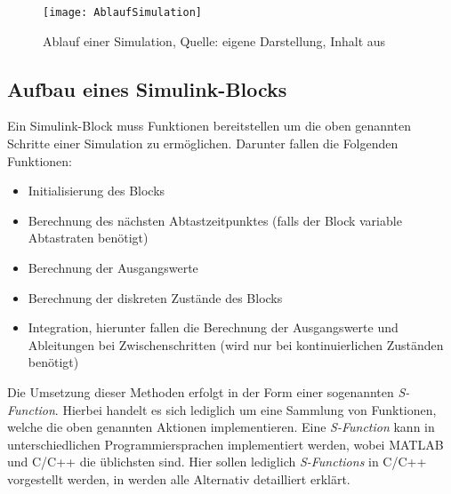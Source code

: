 \begin{figure}[h]
	\texttt{[image: AblaufSimulation]}
	\caption{Ablauf einer Simulation, Quelle: eigene Darstellung, Inhalt aus \cite{SFunc}}
\end{figure}

\subsection{Aufbau eines Simulink-Blocks}
Ein Simulink-Block muss Funktionen bereitstellen um die oben genannten Schritte einer Simulation zu ermöglichen. Darunter fallen die Folgenden Funktionen:

\begin{itemize}
	\item Initialisierung des Blocks
	\item Berechnung des nächsten Abtastzeitpunktes (falls der Block variable Abtastraten benötigt)
	\item Berechnung der Ausgangswerte
	\item Berechnung der diskreten Zustände des Blocks
	\item Integration, hierunter fallen die Berechnung der Ausgangswerte und Ableitungen bei Zwischenschritten (wird nur bei kontinuierlichen Zuständen benötigt)
\end{itemize}

Die Umsetzung dieser Methoden erfolgt in der Form einer sogenannten \textit{S-Function}. Hierbei handelt es sich lediglich um eine Sammlung von Funktionen, welche die oben genannten Aktionen implementieren. Eine \textit{S-Function} kann in unterschiedlichen Programmiersprachen implementiert werden, wobei MATLAB und C/C++ die üblichsten sind. Hier sollen lediglich \textit{S-Functions} in C/C++ vorgestellt werden, in \cite{SFunc} werden alle Alternativ detailliert erklärt. 